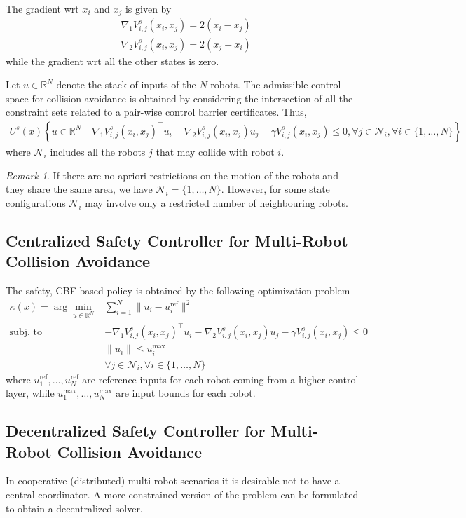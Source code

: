 \documentclass{book}
\newcommand{\R}{\mathbb{R}}
\theoremstyle{theoremv2}
\theoremstyle{defv2}
\theoremstyle{remark}
\newtheorem*{remark}{Remark}
\theoremstyle{remark}
\theoremstyle{definition}
\theoremstyle{definition}
\begin{document}
The gradient wrt $x_i$ and $x_j$ is given by 
\begin{align*}
    & \nabla_1 V_{i,j}^s(x_i,x_j) = 2(x_i-x_j)\\
    & \nabla_2 V_{i,j}^s(x_i,x_j) = 2(x_j-x_i)
\end{align*}
while the gradient wrt all the other states is zero.

Let $u\in\R^N$ denote the stack of inputs of the $N$ robots. The admissible control space for collision avoidance is obtained by considering the intersection of all the constraint sets related to a pair-wise control barrier certificates. Thus, 
\begin{gather*}
    U^s(x) \left\{ u\in\R^N | -\nabla_1V_{i,j}^s(x_i,x_j)^\top u_i - \nabla_2 V_{i,j}^s(x_i,x_j) u_j - \gamma V_{i,j}^s(x_i,x_j) \leq 0, \forall j \in \mathcal{N}_i, \forall i \in \{1,\dots,N\}\right\}
\end{gather*}
where $\mathcal{N}_i$ includes all the robots $j$ that may collide with robot $i$.
\begin{remark}
    If there are no apriori restrictions on the motion of the robots and they share the same area, we have $\mathcal{N}_i = \{1,\dots,N\}$. However, for some state configurations $\mathcal{N}_i$ may involve only a restricted number of neighbouring robots.
\end{remark}


\subsection{Centralized Safety Controller for Multi-Robot Collision Avoidance}
The safety, CBF-based policy is obtained by the following optimization problem
\begin{align*}
    \kappa(x) = \arg \min_{u\in\R^N} &\displaystyle\sum_{i=1}^{N} \|u_i-u_i^\text{ref}\|^2\\
    \text{subj. to } & -\nabla_1V_{i,j}^s(x_i,x_j)^\top u_i - \nabla_2 V_{i,j}^s(x_i,x_j) u_j - \gamma V_{i,j}^s(x_i,x_j) \leq 0\\ 
    & \|u_i\|\leq u_i^\text{max}\\
    & \forall j \in \mathcal{N}_i, \forall i \in\{1,\dots,N\}
\end{align*}
where $u_1^\text{ref},\dots,u_N^\text{ref}$ are reference inputs for each robot coming from a higher control layer, while $u_1^\text{max},\dots,u_N^\text{max}$ are input bounds for each robot.


\subsection{Decentralized Safety Controller for Multi-Robot Collision Avoidance}
In cooperative (distributed) multi-robot scenarios it is desirable not to have a central coordinator. A more constrained version of the problem can be formulated to obtain a decentralized solver. 
\end{document}

